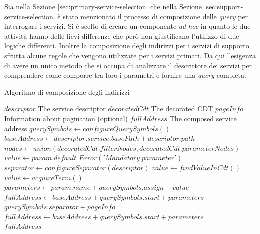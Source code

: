 Sia nella Sezione \ref{sec:primary-service-selection} che nella Sezione \ref{sec:support-service-selection} è stato menzionato il processo di composizione delle \emph{query} per interrogare i servizi. Si è scelto di creare un componente \emph{ad-hoc} in quanto le due attività hanno delle lievi differenze che però non giustificano l'utilizzo di due logiche differenti. Inoltre la composizione degli indirizzi per i servizi di supporto sfrutta alcune regole che vengono utilizzate per i servizi primari. Da qui l'esigenza di avere un unico metodo che si occupa di analizzare il descrittore dei servizi per comprendere come comporre tra loro i parametri e fornire una \emph{query} completa.

\begin{algorithm}
	\caption{Algoritmo di composizione degli indirizzi}
	\label{alg:algoritmo-composizione-indirizzi}
	\begin{algorithmic}
		\Require
			\Statex $ descriptor $ \Comment The service descriptor
			\Statex $ decoratedCdt $ \Comment The decorated CDT
			\Statex $ pageInfo $ \Comment Information about pagination  (optional)
		\Ensure
			\Statex $ fullAddress $ \Comment The composed service address
		\Statex
		\State $ querySymbols \gets configureQuerySymbols() $
		\State $ baseAddress \gets descriptor.service.basePath + descriptor.path $
		\State $ nodes \gets union(decoratedCdt.filterNodes, decoratedCdt.parameterNodes) $
					\State $ value \gets  param.default  $
				\Else
						\State $ Error('Mandatory\; parameter') $
					\EndIf
				\EndIf
			\Else
				\State $ separator \gets configureSeparator(descriptor) $
					\State $ value \gets findValueInCdt() $
				\Else
					\State $ value \gets acquireTerm() $
				\EndIf
			\EndIf
			\State $ parameters \gets param.name + querySymbols.assign + value  $
		\EndFor
			\State $ fullAddress \gets baseAddress + querySymbols.start + parameters +$
			\State\hspace{\algorithmicindent} $ querySymbols.separator + pageInfo $
		\Else
			\State $ fullAddress \gets baseAddress + querySymbols.start + parameters$
		\EndIf\\
		\Return $ fullAddress $
	\end{algorithmic}
\end{algorithm}

